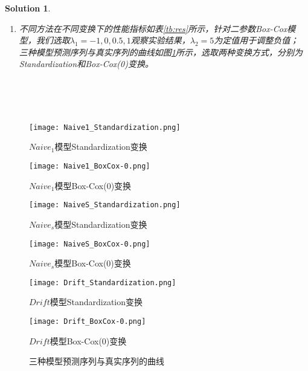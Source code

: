 \documentclass[a4paper,UTF8]{article}
\numberwithin{equation}{section}
\newtheorem*{mySol}{Solution}
\begin{document}
\begin{mySol}
\begin{enumerate}[ {(}1{)}]
			$$ MSE = \frac{1}{H}\sum_{i=1}^{H}(y_{n+i}-y_{n+i}')^2$$
			MAE (Mean Absolute Error)\\
			$$ MAE = \frac{1}{H}\sum_{i=1}^{H}|y_{n+i}-y_{n+i}'|$$
			MAPE (Mean Absolute Percentage Error)\\
			$$ MAPE = \frac{100}{H}\sum_{i=1}^{H}\frac{|y_{n+i}-y_{n+i}'|}{|y_{n+i}|}$$
			sMAPE (symmetric MAPE)\\
			$$ sMAPE = \frac{200}{H}\sum_{i=1}^{H}\frac{|y_{n+i}-y_{n+i}'|}{|y_{n+i}|+|y_{n+i}'|}$$
			MASE (Mean Absolute Scaled Error)
			$$ MASE = \frac{1}{H}\sum_{i=1}^{H}\frac{|y_{n+i}-y_{n+i}'|}{\frac{1}{n+H-m}\sum_{j=m+1}^{n+H}|y_j-y_{j-m}|}$$
			\item
			不同方法在不同变换下的性能指标如表\ref{tb:res}所示，针对二参数Box-Cox模型，我们选取$\lambda_1=-1,0,0.5,1$观察实验结果，$\lambda_2=5$为定值用于调整负值；\\
			三种模型预测序列与真实序列的曲线如图\ref{fig:1}所示，选取两种变换方式，分别为Standardization和Box-Cox(0)变换。\\
		
		\end{enumerate} 



		~\\
		~\\
		~\\
	\end{mySol}
\begin{figure}
	\caption{三种模型预测序列与真实序列的曲线}
	\begin{minipage}{0.48\linewidth}
		\centerline{\texttt{[image: Naive1\_Standardization.png]}}
		\centerline{$Naive_1$模型Standardization变换}
	\end{minipage}
	\hfill 
	\begin{minipage}{0.48\linewidth}
		\centerline{\texttt{[image: Naive1\_BoxCox-0.png]}}
		\centerline{$Naive_1$模型Box-Cox(0)变换}
	\end{minipage}
	\vfill
	\begin{minipage}{0.48\linewidth}
		\centerline{\texttt{[image: NaiveS\_Standardization.png]}}
		\centerline{$Naive_s$模型Standardization变换}
	\end{minipage}
	\hfill 
	\begin{minipage}{0.48\linewidth}
		\centerline{\texttt{[image: NaiveS\_BoxCox-0.png]}}
		\centerline{$Naive_s$模型Box-Cox(0)变换}
	\end{minipage}
	\vfill
	\begin{minipage}{0.48\linewidth}
		\centerline{\texttt{[image: Drift\_Standardization.png]}}
		\centerline{$Drift$模型Standardization变换}
	\end{minipage}
	\hfill 
	\begin{minipage}{0.48\linewidth}
		\centerline{\texttt{[image: Drift\_BoxCox-0.png]}}
		\centerline{$Drift$模型Box-Cox(0)变换}
	\end{minipage}
	\label{fig:1}
	
\end{figure}
	\newpage
\end{document}
